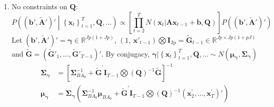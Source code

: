 \documentclass[]{article}
\begin{document}
\begin{enumerate}
	\def\labelenumi{(\arabic{enumi})}
	\item
	No constraints on \(\mathbf{Q}\):
	\[P\left( \left( \mathbf{b}',{\widetilde{\mathbf{A}}'} \right)' \middle| \left\{ \mathbf{x}_{t} \right\}_{t = 1}^{T},\mathbf{Q},\ldots \right) \propto \left\lbrack \prod_{t = 2}^{T}{N\left( \mathbf{x}_{t}|\mathbf{A}\mathbf{x}_{t - 1} + \mathbf{b},\mathbf{Q} \right)} \right\rbrack P\left( \left( \mathbf{b}',{\widetilde{\mathbf{A}}'} \right)' \right)\]
	Let
	\(\left( \mathbf{b'},{\widetilde{\mathbf{A}}'} \right)' = \bm{\gamma} \in \mathbb{R}^{Jp(1 + Jp)}\),
	\(\left( 1,\ {\mathbf{x}'_{t - 1}} \right)\bigotimes\mathbf{I}_{\text{Jp}}\mathbf{=}{\widetilde{\mathbf{G}}}_{t - 1} \in \mathbb{R}^{Jp \times Jp(1 + pJ)}\)
	and
	\(\widetilde{\mathbf{G}} = \left( {\widetilde{\mathbf{G}}'}_{1},\ldots,{\widetilde{\mathbf{G}}'}_{T - 1} \right)'\).
	By conjugacy, \(\bm{\gamma}|\left\{ \mathbf{x}_{t} \right\}_{t = 1}^{T},\mathbf{Q},\ldots \sim N(\bm{\mu}_{\bm{\gamma}},\mathbf{\Sigma}_{\bm{\gamma}})\)
	\begin{align*}
		\mathbf{\Sigma}_{\bm{\gamma}} &= \left\lbrack \mathbf{\Sigma}_{BA_{0}}^{- 1} + {\widetilde{\mathbf{G}}}^{\mathbf{'}}\mathbf{I}_{T - 1}\bigotimes\left( \mathbf{Q} \right)^{- 1}\widetilde{\mathbf{G}} \right\rbrack^{- 1}\\
		\bm{\mu}_{\bm{\gamma}} &= \mathbf{\Sigma}_{\bm{\gamma}}\left( \mathbf{\Sigma}_{BA_{0}}^{- 1}\bm{\mu}_{BA_{0}} + {\widetilde{\mathbf{G}}}^{'}\mathbf{I}_{T - 1}\bigotimes\left( \mathbf{Q} \right)^{- 1}\left( \mathbf{x}_{2}^{'},\ldots,\mathbf{x}_{T}^{'} \right)' \right)
	\end{align*}
	

\end{enumerate}
\end{document}
